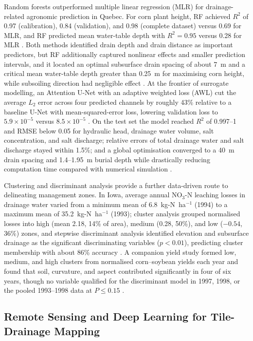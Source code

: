 Random forests outperformed multiple linear regression (MLR) for
drainage-related agronomic prediction in Quebec. For corn plant height, RF
achieved $R^2$ of 0.97 (calibration), 0.84 (validation), and 0.98 (complete
dataset) versus 0.69 for MLR, and RF predicted mean water-table depth with
$R^2=0.95$ versus 0.28 for MLR \parencite{Djiemon2019}. Both methods identified
drain depth and drain distance as important predictors, but RF additionally
captured nonlinear effects and smaller prediction intervals, and it located an
optimal subsurface drain spacing of about 7~m and a critical mean water-table
depth greater than 0.25~m for maximising corn height, while subsoiling direction
had negligible effect \parencite{Djiemon2019}. At the frontier of surrogate
modelling, an Attention U-Net with an adaptive weighted loss (AWL) cut the
average $L_2$ error across four predicted channels by roughly 43\% relative to a
baseline U-Net with mean-squared-error loss, lowering validation loss to
$5.9\times10^{-5}$ versus $8.5\times10^{-5}$ \parencite{Lei2026}. On the test set
the model reached $R^2$ of 0.997--1 and RMSE below 0.05 for hydraulic head,
drainage water volume, salt concentration, and salt discharge; relative errors
of total drainage water and salt discharge stayed within 1.5\%; and a global
optimisation converged to a 40~m drain spacing and 1.4--1.95~m burial depth
while drastically reducing computation time compared with numerical simulation
\parencite{Lei2026}.

Clustering and discriminant analysis provide a further data-driven route to
delineating management zones. In Iowa, average annual NO$_3$-N leaching losses in
drainage water varied from a minimum mean of 6.8~kg-N~ha$^{-1}$ (1994) to a
maximum mean of 35.2~kg-N~ha$^{-1}$ (1993); cluster analysis grouped normalised
losses into high (mean 2.18, 14\% of area), medium (0.28, 50\%), and low
($-0.54$, 36\%) zones, and stepwise discriminant analysis identified elevation
and subsurface drainage as the significant discriminating variables
($p<0.01$), predicting cluster membership with about 86\% accuracy
\parencite{Bakhsh2005b}. A companion yield study formed low, medium, and high
clusters from normalised corn--soybean yields each year and found that soil,
curvature, and aspect contributed significantly in four of six years, though no
variable qualified for the discriminant model in 1997, 1998, or the pooled
1993--1998 data at $P\le0.15$ \parencite{Bakhsh2007b}.

\subsection{Remote Sensing and Deep Learning for Tile-Drainage Mapping}

